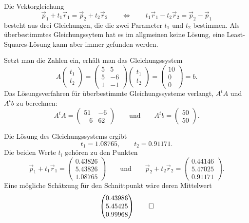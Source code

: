 \begin{loesung}
\begin{teilaufgaben}
\item
Die Vektorgleichung
\[
\vec p_1+t_1\vec r_1 = \vec p_2 + t_2\vec r_2
\qquad\Leftrightarrow\qquad
t_1\vec r_1 - t_2\vec r_2 = \vec p_2 -\vec p_1
\]
besteht aus drei Gleichungen, die die zwei Parameter $t_1$ und $t_2$ 
bestimmen. 
Als überbestimmtes Gleichungssytem hat es im allgmeinen keine
Lösung, eine Least-Squares-Lösung kann aber immer gefunden werden.

Setzt man die Zahlen ein, erhält man das Gleichungssystem
\[
A
\begin{pmatrix}
t_1\\t_2
\end{pmatrix}
=
\begin{pmatrix}
5& 5\\
5&-6\\
1&-1
\end{pmatrix}
\begin{pmatrix}
t_1\\t_2
\end{pmatrix}
=
\begin{pmatrix}
10\\0\\0
\end{pmatrix}
=
b.
\]
Das Lösungsverfahren für überbestimmte Gleichungssysteme verlangt,
$A^tA$ und $A^tb$ zu berechnen:
\[
A^tA=\begin{pmatrix}51&-6\\-6&62\end{pmatrix}
\qquad\text{und}\qquad
A^tb=\begin{pmatrix}50\\50\end{pmatrix}.
\]
\item
Die Lösung des Gleichungssystems ergibt
\[
t_1 = 1.08765,
\qquad
t_2 = 0.91171.
\]
Die beiden Werte $t_i$ gehören zu den Punkten
\[
\vec p_1+t_1\vec r_1
=
\begin{pmatrix}
   0.43826\\
   5.43826\\
   1.08765
\end{pmatrix}
\qquad\text{und}\qquad
\vec p_2+t_2\vec r_2
=
\begin{pmatrix}
   0.44146\\
   5.47025\\
   0.91171
\end{pmatrix}.
\]
Eine mögliche Schätzung für den Schnittpunkt wäre deren Mittelwert
\begin{equation}
\begin{pmatrix}
   0.43986\\
   5.45425\\
   0.99968
\end{pmatrix}
\label{40000044:loes}
\qedhere
\end{equation}
\end{teilaufgaben}
\end{loesung}

